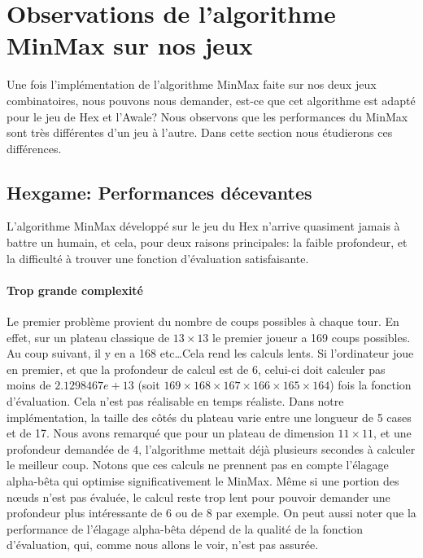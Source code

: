 




\section{Observations de l'algorithme MinMax sur nos jeux}
Une fois l'implémentation de l'algorithme MinMax faite sur nos deux
jeux combinatoires, nous pouvons nous demander, est-ce que cet algorithme est adapté pour le jeu de Hex et l'Awale?
Nous observons que les performances du MinMax sont très différentes d'un jeu à l'autre. Dans cette section nous étudierons ces différences.

\subsection{Hexgame: Performances décevantes}
L'algorithme MinMax développé sur le jeu du Hex n'arrive quasiment jamais à battre un humain, et cela, pour
deux raisons principales: la faible profondeur, et la difficulté à trouver une fonction d'évaluation satisfaisante.

\paragraph{Trop grande complexité} Le premier problème provient du nombre de coups possibles à chaque tour.
En effet, sur un plateau classique de $13\times13$ le premier joueur a 169 coups possibles. Au coup suivant, il y en a 168 etc\dots Cela rend les calculs lents. 
Si l'ordinateur joue en premier, et que la profondeur de calcul est de 6, celui-ci doit calculer pas moins de $2.1298467e+13$ (soit $169\times168\times167\times166\times165\times164$)
fois la fonction d'évaluation. Cela n'est pas réalisable en temps réaliste. Dans notre implémentation, la taille des côtés du plateau varie entre
une longueur de 5 cases et de 17. Nous avons remarqué que pour un plateau de dimension $11\times11$, et une profondeur demandée de 4, l'algorithme
mettait déjà plusieurs secondes à calculer le meilleur coup. Notons que ces calculs ne prennent pas en compte l'élagage alpha-bêta
qui optimise significativement le MinMax. Même si une portion des nœuds n'est pas évaluée, le calcul reste trop lent pour pouvoir demander une
profondeur plus intéressante de 6 ou de 8 par exemple.
On peut aussi noter que la performance de l'élagage alpha-bêta dépend de la qualité de la fonction d'évaluation, qui, comme nous allons
le voir, n'est pas assurée.

